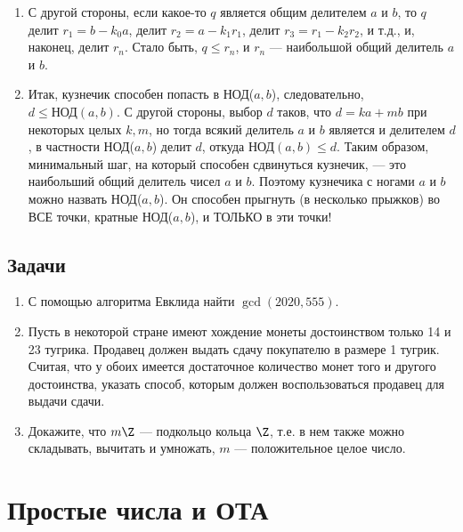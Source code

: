 \begin{enumerate}
\item С другой стороны, если какое-то $q$ является общим делителем $a$ и $b$, то $q$ делит $r_1=b-k_0a$, делит $r_2=a-k_1r_1$, делит $r_3=r_1-k_2r_2$, и т.д., и, наконец, делит $r_n$. Стало быть, $q\le r_n$, и $r_n$ --- наибольшой общий делитель $a$ и $b$.
\item Итак, кузнечик способен попасть в НОД($a,b$), следовательно, $d\le\mbox{НОД}(a,b)$. С другой стороны, выбор $d$ таков, что $d=ka+mb$ при некоторых целых $k,m$, но тогда всякий делитель $a$ и $b$ является и делителем $d$, в частности НОД($a,b$) делит $d$, откуда $\mbox{НОД}(a,b)\le d$. Таким образом, минимальный шаг, на который способен сдвинуться кузнечик, --- это наибольший общий делитель чисел $a$ и $b$. Поэтому кузнечика с ногами $a$ и $b$ можно назвать НОД($a,b$). Он способен прыгнуть (в несколько прыжков) во ВСЕ точки, кратные НОД($a,b$), и ТОЛЬКО в эти точки!
\end{enumerate}
\subsection*{Задачи}
\begin{enumerate}
\item С помощью алгоритма Евклида найти $\gcd(2020,555)$.
\item Пусть в некоторой стране имеют хождение монеты достоинством только 14 и 23 тугрика. Продавец должен выдать сдачу покупателю в размере 1 тугрик. Считая, что у обоих имеется достаточное количество монет того и другого достоинства, указать способ, которым должен воспользоваться продавец для выдачи сдачи.
\item Докажите, что $m\Z$ --- подкольцо кольца $\Z$, т.е. в нем также можно складывать, вычитать и умножать, $m$ --- положительное целое число.
\end{enumerate}


\section{Простые числа и ОТА}\label{PrimeNumbers}


